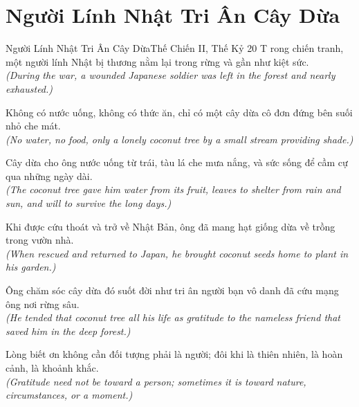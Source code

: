 \section{Người Lính Nhật Tri Ân Cây Dừa}
\begin{truyen}{Người Lính Nhật Tri Ân Cây Dừa}{Thế Chiến II, Thế Kỷ 20}
T rong chiến tranh, một người lính Nhật bị thương nằm lại trong rừng và gần như kiệt sức.\\
\textit{(During the war, a wounded Japanese soldier was left in the forest and nearly exhausted.)}

Không có nước uống, không có thức ăn, chỉ có một cây dừa cô đơn đứng bên suối nhỏ che mát.\\
\textit{(No water, no food, only a lonely coconut tree by a small stream providing shade.)}

Cây dừa cho ông nước uống từ trái, tàu lá che mưa nắng, và sức sống để cầm cự qua những ngày dài.\\
\textit{(The coconut tree gave him water from its fruit, leaves to shelter from rain and sun, and will to survive the long days.)}

Khi được cứu thoát và trở về Nhật Bản, ông đã mang hạt giống dừa về trồng trong vườn nhà.\\
\textit{(When rescued and returned to Japan, he brought coconut seeds home to plant in his garden.)}

Ông chăm sóc cây dừa đó suốt đời như tri ân người bạn vô danh đã cứu mạng ông nơi rừng sâu.\\
\textit{(He tended that coconut tree all his life as gratitude to the nameless friend that saved him in the deep forest.)}

\end{truyen}
\begin{baihoc}
  Lòng biết ơn không cần đối tượng phải là người; đôi khi là thiên nhiên, là hoàn cảnh, là khoảnh khắc.\\
  \textit{(Gratitude need not be toward a person; sometimes it is toward nature, circumstances, or a moment.)}
\end{baihoc}

